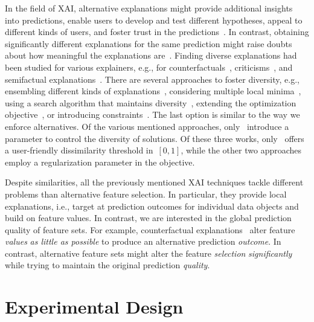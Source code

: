 \documentclass{article}
\theoremstyle{definition}
\begin{document}
In the field of XAI, alternative explanations might provide additional insights into predictions, enable users to develop and test different hypotheses, appeal to different kinds of users, and foster trust in the predictions~\cite{kim2021multi, wang2019designing}.
In contrast, obtaining significantly different explanations for the same prediction might raise doubts about how meaningful the explanations are~\cite{jain2019attention}.
Finding diverse explanations had been studied for various explainers, e.g., for counterfactuals~\cite{dandl2020multi, karimi2020model, mohammadi2021scaling, mothilal2020explaining, russell2019efficient, wachter2017counterfactual}, criticisms~\cite{kim2016examples}, and semifactual explanations~\cite{artelt2022even}.
There are several approaches to foster diversity, e.g., ensembling different kinds of explanations~\cite{silva2019produce}, considering multiple local minima~\cite{wachter2017counterfactual}, using a search algorithm that maintains diversity~\cite{dandl2020multi}, extending the optimization objective~\cite{artelt2022even, kim2016examples, mothilal2020explaining}, or introducing constraints~\cite{karimi2020model, mohammadi2021scaling, russell2019efficient}.
The last option is similar to the way we enforce alternatives.
Of the various mentioned approaches, only~\cite{artelt2022even, mohammadi2021scaling, mothilal2020explaining} introduce a parameter to control the diversity of solutions.
Of these three works, only~\cite{mohammadi2021scaling} offers a user-friendly dissimilarity threshold in~$[0,1]$, while the other two approaches employ a regularization parameter in the objective.

Despite similarities, all the previously mentioned XAI techniques tackle different problems than alternative feature selection.
In particular, they provide local explanations, i.e., target at prediction outcomes for individual data objects and build on feature values.
In contrast, we are interested in the global prediction quality of feature sets.
For example, counterfactual explanations~\cite{guidotti2022counterfactual, stepin2021survey, verma2020counterfactual} alter feature \emph{values} \emph{as little as possible} to produce an alternative prediction \emph{outcome}.
In contrast, alternative feature sets might alter the feature \emph{selection} \emph{significantly} while trying to maintain the original prediction \emph{quality}.

\section{Experimental Design}
\label{sec:afs:experimental-design}
\end{document}
